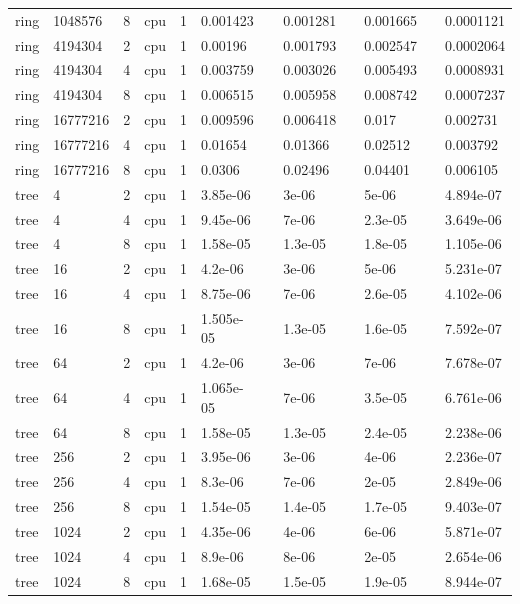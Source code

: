 \begin{tabular}{llllllllllll}
ring & 1048576 & 8 & cpu & 1 & 0.001423 &  & 0.001281 &  & 0.001665 &  & 0.0001121 \\
ring & 4194304 & 2 & cpu & 1 & 0.00196 &  & 0.001793 &  & 0.002547 &  & 0.0002064 \\
ring & 4194304 & 4 & cpu & 1 & 0.003759 &  & 0.003026 &  & 0.005493 &  & 0.0008931 \\
ring & 4194304 & 8 & cpu & 1 & 0.006515 &  & 0.005958 &  & 0.008742 &  & 0.0007237 \\
ring & 16777216 & 2 & cpu & 1 & 0.009596 &  & 0.006418 &  & 0.017 &  & 0.002731 \\
ring & 16777216 & 4 & cpu & 1 & 0.01654 &  & 0.01366 &  & 0.02512 &  & 0.003792 \\
ring & 16777216 & 8 & cpu & 1 & 0.0306 &  & 0.02496 &  & 0.04401 &  & 0.006105 \\
tree & 4 & 2 & cpu & 1 & 3.85e-06 &  & 3e-06 &  & 5e-06 &  & 4.894e-07 \\
tree & 4 & 4 & cpu & 1 & 9.45e-06 &  & 7e-06 &  & 2.3e-05 &  & 3.649e-06 \\
tree & 4 & 8 & cpu & 1 & 1.58e-05 &  & 1.3e-05 &  & 1.8e-05 &  & 1.105e-06 \\
tree & 16 & 2 & cpu & 1 & 4.2e-06 &  & 3e-06 &  & 5e-06 &  & 5.231e-07 \\
tree & 16 & 4 & cpu & 1 & 8.75e-06 &  & 7e-06 &  & 2.6e-05 &  & 4.102e-06 \\
tree & 16 & 8 & cpu & 1 & 1.505e-05 &  & 1.3e-05 &  & 1.6e-05 &  & 7.592e-07 \\
tree & 64 & 2 & cpu & 1 & 4.2e-06 &  & 3e-06 &  & 7e-06 &  & 7.678e-07 \\
tree & 64 & 4 & cpu & 1 & 1.065e-05 &  & 7e-06 &  & 3.5e-05 &  & 6.761e-06 \\
tree & 64 & 8 & cpu & 1 & 1.58e-05 &  & 1.3e-05 &  & 2.4e-05 &  & 2.238e-06 \\
tree & 256 & 2 & cpu & 1 & 3.95e-06 &  & 3e-06 &  & 4e-06 &  & 2.236e-07 \\
tree & 256 & 4 & cpu & 1 & 8.3e-06 &  & 7e-06 &  & 2e-05 &  & 2.849e-06 \\
tree & 256 & 8 & cpu & 1 & 1.54e-05 &  & 1.4e-05 &  & 1.7e-05 &  & 9.403e-07 \\
tree & 1024 & 2 & cpu & 1 & 4.35e-06 &  & 4e-06 &  & 6e-06 &  & 5.871e-07 \\
tree & 1024 & 4 & cpu & 1 & 8.9e-06 &  & 8e-06 &  & 2e-05 &  & 2.654e-06 \\
tree & 1024 & 8 & cpu & 1 & 1.68e-05 &  & 1.5e-05 &  & 1.9e-05 &  & 8.944e-07 \\

\end{tabular}
